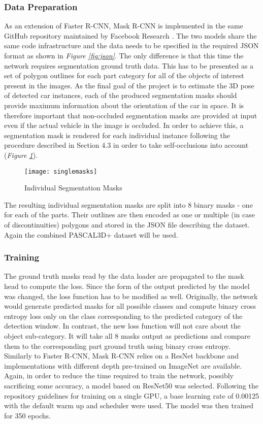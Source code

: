 \documentclass[main.tex]{subfiles}
\begin{document}
\subsubsection{Data Preparation}
As an extension of Faster R-CNN, Mask R-CNN is implemented in the same GitHub repository maintained by Facebook Research \cite{massa2018mrcnn}. The two models share the same code infrastructure and the data needs to be specified in the required JSON format as shown in \emph{Figure \ref{fig:json}}. The only difference is that this time the network requires segmentation ground truth data. This has to be presented as a set of polygon outlines for each part category for all of the objects of interest present in the images. As the final goal of the project is to estimate the 3D pose of detected car instances, each of the produced segmentation masks should provide maximum information about the orientation of the car in space. It is therefore important that non-occluded segmentation masks are provided at input even if the actual vehicle in the image is occluded. In order to achieve this, a segmentation mask is rendered for each individual instance following the procedure described in Section 4.3 in order to take self-occlusions into account (\emph{Figure \ref{fig:singlemasks}}).
\begin{figure}[H]
\centering
\texttt{[image: singlemasks]}
\caption{Individual Segmentation Masks}
\label{fig:singlemasks}
\end{figure}
\indent The resulting individual segmentation masks are split into 8 binary masks - one for each of the parts. Their outlines are then encoded as one or multiple (in case of discontinuities) polygons and stored in the JSON file describing the dataset. Again the combined PASCAL3D+ dataset will be used. 
\subsubsection{Training}
The ground truth masks read by the data loader are propagated to the mask head to compute the loss. Since the form of the output predicted by the model was changed, the loss function has to be modified as well. Originally, the network would generate predicted masks for all possible classes and compute binary cross entropy loss only on the class corresponding to the predicted category of the detection window. In contrast, the new loss function will not care about the object sub-category. It will take all 8 masks output as predictions and compare them to the corresponding part ground truth using binary cross entropy. \\
\indent Similarly to Faster R-CNN, Mask R-CNN relies on a ResNet backbone and implementations with different depth pre-trained on ImageNet are available. Again, in order to reduce the time required to train the network, possibly sacrificing some accuracy, a model based on ResNet50 was selected. Following the repository guidelines for training on a single GPU, a base learning rate of 0.00125 with the default warm up and scheduler were used. The model was then trained for 350 epochs. 
\end{document}

